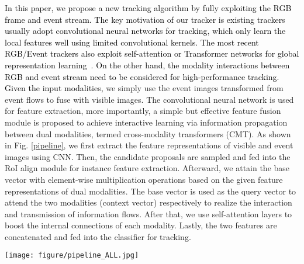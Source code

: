 \documentclass[journal]{IEEEtran}
\begin{document}
\textcolor{black}{
In this paper, we propose a new tracking algorithm by fully exploiting the RGB frame and event stream. The key motivation of our tracker is existing trackers usually adopt convolutional neural networks for tracking, which only learn the local features well using limited convolutional kernels. The most recent RGB/Event trackers also exploit self-attention or Transformer networks for global representation learning~\cite{zhang2022STNet, chen2021TransT}. On the other hand, the modality interactions between RGB and event stream need to be considered for high-performance tracking. Given the input modalities, 
}
we simply use the event images transformed from event flows to fuse with visible images. The convolutional neural network is used for feature extraction, more importantly, a simple but effective feature fusion module is proposed to achieve interactive learning via information propagation between dual modalities, termed cross-modality transformers (CMT). As shown in Fig. \ref{pipeline}, we first extract the feature representations of visible and event images using CNN. Then, the candidate proposals are sampled and fed into the RoI align module for instance feature extraction. Afterward, we attain the base vector  with element-wise multiplication operations based on the given feature representations of dual modalities. The base vector is used as the query vector to attend the two modalities (context vector) respectively to realize the interaction and transmission of information flows. After that, we use self-attention layers to boost the internal connections of each modality. Lastly, the two features are concatenated and fed into the classifier for tracking. 





\begin{figure*}
\center
\texttt{[image: figure/pipeline\_ALL.jpg]}
\caption{ 
\textcolor{black}{An overview of our proposed tracking framework via collaboration of visible frame and event streams. The RT-MDNet tracker is adopted as an example to demonstrate our tracking procedure. Given the RGB and Event frames, we first extract the positive and negative training samples from the first frame to learn a classifier. Three convolutional layers are used to extract the deep feature maps. Then, the RoI Align operator is adopted to extract the instance-level features given the extracted proposals for both modalities. The RGB and Event features are first connected using the dot product to get the base vector, then, the cross-attention is conducted for each modality to enhance the message passing. Self-attention is proposed to learn the global features that are complementary to local CNN features. Finally, we feed the feature vectors into fully connected layers for proposal classification. The best-scored proposal is selected as the tracking result of the current step and similar procedures are repeated until the end of the testing video.} }     
\label{pipeline}
\end{figure*} 	
\end{document}
